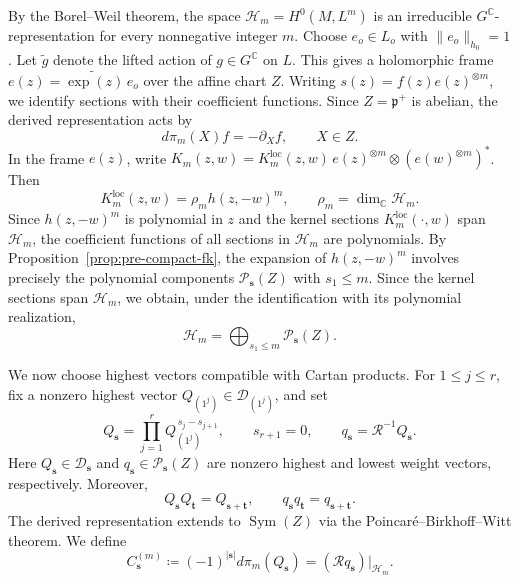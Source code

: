 \documentclass[11pt,reqno]{amsart}
\theoremstyle{corollary}
\theoremstyle{conjecture}
\theoremstyle{assumption}
\theoremstyle{proposition}
\theoremstyle{remark}
\numberwithin{equation}{section}
\newcommand{\pa}{\partial}
\begin{document}
By the Borel--Weil theorem, the space $\mathcal H_m=H^0(M,L^m)$ is an irreducible $G^{\mathbb C}$-representation for every nonnegative integer $m$. Choose $e_o\in L_o$ with $\|e_o\|_{h_0}=1$. Let $\widetilde g$ denote the lifted action of $g\in G^{\mathbb C}$ on $L$. This gives a holomorphic frame $e(z)=\widetilde{\exp(z)}\,e_o$ over the affine chart $Z$. Writing $s(z)=f(z)e(z)^{\otimes m}$, we identify sections with their coefficient functions. Since $Z=\mathfrak p^+$ is abelian, the derived representation acts by
\[
d\pi_m(X)f=-\pa_Xf,\qquad X\in Z.
\]
In the frame $e(z)$, write $K_m(z,w)=K_m^{\operatorname{loc}}(z,w)\,e(z)^{\otimes m}\otimes(e(w)^{\otimes m})^*$. Then
\[
K_m^{\operatorname{loc}}(z,w)=\rho_m h(z,-w)^m,\qquad \rho_m=\dim_{\mathbb C}\mathcal H_m.
\]
Since $h(z,-w)^m$ is polynomial in $z$ and the kernel sections $K_m^{\operatorname{loc}}(\cdot,w)$ span $\mathcal H_m$, the coefficient functions of all sections in $\mathcal H_m$ are polynomials. By Proposition~\ref{prop:pre-compact-fk}, the expansion of $h(z,-w)^m$ involves precisely the polynomial components $\mathcal P_{\mathbf s}(Z)$ with $s_1\leq m$. Since the kernel sections span $\mathcal H_m$, we obtain, under the identification with its polynomial realization,
\[
\mathcal H_m=\bigoplus_{s_1\leq m}\mathcal P_{\mathbf s}(Z).
\]


We now choose highest vectors compatible with Cartan products. For $1\leq j\leq r$, fix a nonzero highest vector $Q_{(1^j)}\in\mathcal D_{(1^j)}$, and set
\[
Q_{\mathbf s}=\prod_{j=1}^r Q_{(1^j)}^{\,s_j-s_{j+1}},\qquad s_{r+1}=0,\qquad q_{\mathbf s}=\mathcal R^{-1}Q_{\mathbf s}.
\]
Here $Q_{\mathbf s}\in\mathcal D_{\mathbf s}$ and $q_{\mathbf s}\in\mathcal P_{\mathbf s}(Z)$ are nonzero highest and lowest weight vectors, respectively. Moreover,
\[
Q_{\mathbf s}Q_{\mathbf t}=Q_{\mathbf s+\mathbf t},\qquad q_{\mathbf s}q_{\mathbf t}=q_{\mathbf s+\mathbf t}.
\]
The derived representation extends to $\operatorname{Sym}(Z)$ via the Poincar\'e--Birkhoff--Witt theorem. We define
\[
C_{\mathbf s}^{(m)}\coloneq(-1)^{|\mathbf s|}d\pi_m(Q_{\mathbf s})=(\mathcal Rq_{\mathbf s})|_{\mathcal H_m}.
\]
\end{document}
